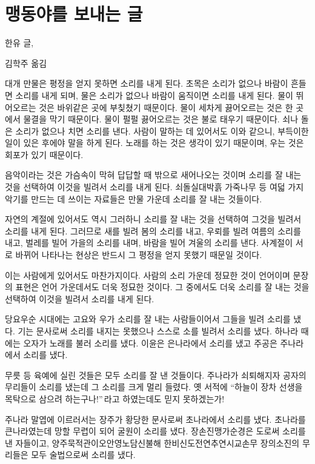 \documentclass[demo,chapter,openany,amsmath,gremph,adjustmath]{oblivoir}
\begin{document}
\section{맹동야를 보내는 글}
\epigraph{한유 글, }{김학주 옮김}

대개 만물은 평정을 얻지 못하면 소리를 내게 된다.
초목은 소리가 없으나 바람이 흔들면 소리를 내게 되며, 물은 소리가 없으나 바람이
움직이면 소리를 내게 된다. 물이 뛰어오르는 것은 바위같은 곳에 부칮쳤기
때문이다. 물이 세차게 끓어오르는 것은 한 곳에서 물결을 막기 때문이다.
물이 펄펄 끓어오르는 것은 불로 태우기 때문이다. 쇠나 돌은 소리가 없으나
치면 소리를 낸다. 사람이 말하는 데 있어서도 이와 같으니,
부득이한 일이 있은 후에야 말을 하게 된다. 노래를 하는 것은 생각이
있기 때문이며, 우는 것은 회포가 있기 때문이다.

음악이라는 것은 가슴속이 막혀 답답할 때 밖으로 새어나오는 것이며
소리를 잘 내는 것을 선택하여 이것을 빌려서 소리를 내게 된다.
쇠\cntrdot 돌\cntrdot 실\cntrdot 대\cntrdot 박\cntrdot 흙\cntrdot 
가죽\cntrdot 나무 등 여덟 가지 악기를 만드는 데 쓰이는 자료들은 만물
가운데 소리를 잘 내는 것들이다.

자연의 계절에 있어서도 역시 그러하니 소리를 잘 내는 것을 선택하여 그것을
빌려서 소리를 내게 된다. 그러므로 새를 빌려 봄의 소리를 내고, 우뢰를
빌려 여름의 소리를 내고, 벌레를 빌어 가을의 소리를 내며,
바람을 빌어 겨울의 소리를 낸다. 사계절이 서로 바뀌어 나타나는 현상은
반드시 그 평정을 얻지 못했기 때문일 것이다.

이는 사람에게 있어서도 마찬가지이다. 사람의 소리 가운데 정묘한 것이 언어이며
문장의 표현은 언어 가운데서도 더욱 정묘한 것이다. 그 중에서도 더욱 소리를
잘 내는 것을 선택하여 이것을 빌려서 소리를 내게 된다.

당요\cntrdot 우순 시대에는 고요와 우가 소리를 잘 내는 사람들이어서
그들을 빌려 소리를 냈다. 기는 문사로써 소리를 내지는 못했으나
스스로 소를 빌려서 소리를 냈다. 하나라 때에는 오자가 노래를 불러 소리를
냈다. 이윤은 은나라에서 소리를 냈고 주공은 주나라에서 소리를 냈다.

무릇 \cntrdot {} 등 육예에 실린 것들은 모두 소리를
잘 낸 것들이다. 주나라가 쇠퇴해지자 공자의 무리들이 소리를 냈는데
그 소리를 크게 멀리 들렸다. 옛 서적에 ``하늘이 장차 선생을 목탁으로
삼으려 하는구나!''\,라고 하였는데도 믿지 못하겠는가!

주나라 말엽에 이르러서는 장주가 황당한 문사로써 초나라에서
소리를 냈다. 초나라를 큰나라였는데 망할 무렵이 되어 굴원이 소리를 냈다.
장손진\cntrdot 맹가\cntrdot 순경은 도로써 소리를 낸 자들이고,
양주\cntrdot 묵적\cntrdot 관이오\cntrdot 안영\cntrdot 노담\cntrdot 신불해\cntrdot 
한비\cntrdot 신도\cntrdot 전연\cntrdot 추연\cntrdot 시교\cntrdot 손무\cntrdot 
장의\cntrdot 소진의 무리들은 모두 술법으로써 소리를 냈다.
\end{document}
